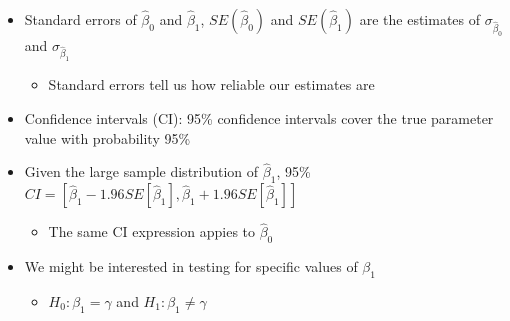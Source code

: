 \documentclass{article}
\begin{document}
\begin{itemize}
\begin{itemize}
\begin{itemize}
            \item Assuming the terms are i.i.d. with finite variance, $\frac{1}{n}\sum_{i=1}^n (X_i - \overline{X})U_i \approx \frac{1}{n} \sum_{i=1}^n (X_i - E[X_i])U_i$
            \begin{itemize}
                \item We can also assume that $E[(X_i - E[X_i])U_i] = 0$ (expected value is zero)
                \item By the central limit theorem, $\sqrt{n} \left( \frac{1}{n} \sum_{i=1}^n (X_i - E[X_i])U_i \right) \overset{d}{\rightarrow} \mathcal{N}(0,Var[(X_i - E[X_i])U_i])$
            \end{itemize}
            \item Putting everything together, we get $\hat{\beta}_1 \approx \mathcal{N}\left( \beta_1, \frac{Var[(X_i - E[X_i])U_i]}{n[Var(X_i)]^2} \right)$
            \item Then $\sigma_{\hat{\beta}_1}^2 = \frac{Var[(X_i - E[X_i])U_i]}{n[Var(X_i)]^2}$
        \end{itemize}
        \item $\sigma_{\hat{\beta}_0}^2$ has a similar expression of $\frac{constant}{n}$
    \end{itemize}
    \item Standard errors of $\hat{\beta}_0$ and $\hat{\beta}_1$, $SE(\hat{\beta}_0)$ and $SE(\hat{\beta}_1)$ are the estimates of $\sigma_{\hat{\beta}_0}$ and $\sigma_{\hat{\beta}_1}$
    \begin{itemize}
        \item Standard errors tell us how reliable our estimates are
    \end{itemize}
    \item Confidence intervals (CI): 95\% confidence intervals cover the true parameter value with probability 95\%
    \item Given the large sample distribution of $\hat{\beta}_1$, 95\% $CI = [\hat{\beta}_1 - 1.96 SE[\hat{\beta}_1], \hat{\beta}_1 + 1.96 SE[\hat{\beta}_1]]$
    \begin{itemize}
        \item The same CI expression appies to $\hat{\beta}_0$
    \end{itemize}
    \item We might be interested in testing for specific values of $\beta_1$
    \begin{itemize}
        \item $H_0 : \beta_1 = \gamma$ and $H_1: \beta_1 \neq \gamma$

\end{itemize}
\end{itemize}
\end{document}
